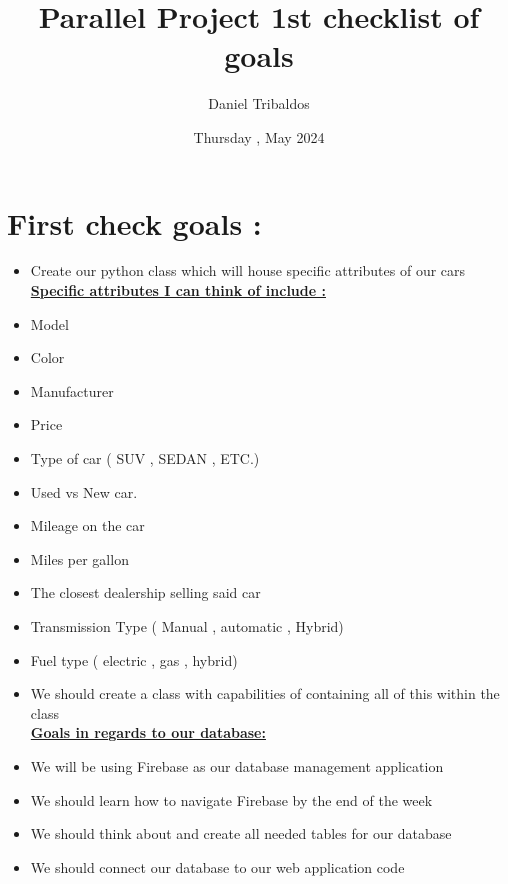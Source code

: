 \documentclass{article}
\title{\textbf{Parallel Project 1st checklist of goals}}
\author{Daniel Tribaldos}
\date{Thursday , May 2024}
\begin{document}
\maketitle

\section{First check goals :}

\begin{itemize}
    \item{ Create our python class which will house specific attributes of our cars}\\ 
    
     \textbf{\underline{Specific attributes I can think of include :}}
         \item Model
         \item Color
         \item Manufacturer
         \item Price
         \item Type of car ( SUV , SEDAN , ETC.)
         \item Used vs New car.
         \item Mileage on the car
         \item Miles per gallon
         \item The closest dealership selling said car
         \item Transmission Type ( Manual , automatic , Hybrid)
         \item Fuel type ( electric , gas , hybrid)\\


         \item We should create a class with capabilities of containing all of this within the class \\

         \textbf{\underline{Goals in regards to our database:}}
            \item We will be using Firebase as our database management application
            \item We should learn how to navigate Firebase by the end of the week
            \item We should think about and create all needed tables for our database
            \item We should connect our database to our web application code
            
     
\end{itemize}
\end{document}
